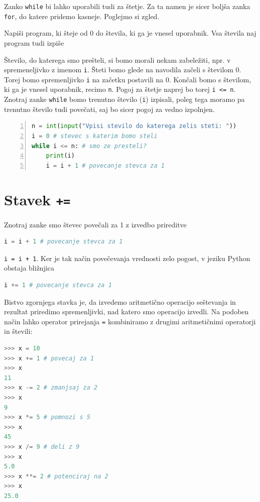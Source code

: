 Zanko \texttt{while} bi lahko uporabili tudi za štetje. Za ta namen je sicer boljša zanka \texttt{for}, do katere pridemo kasneje. Poglejmo si zgled.
\begin{zgled}
Napiši program, ki šteje od 0 do števila, ki ga je vnesel uporabnik. Vsa števila naj program tudi izpiše
\end{zgled}
\begin{resitev}
Število, do katerega smo prešteli, si bomo morali nekam zabeležiti, npr. v spremeneljivko z imenom \texttt{i}. Šteti bomo glede na navodila začeli s številom 0. Torej bomo spremenljivko \texttt{i} na začetku postavili na 0. Končali bomo s številom, ki ga je vnesel uporabnik, recimo \texttt{n}. Pogoj za štetje naprej bo torej \texttt{i <= n}. Znotraj zanke \texttt{while} bomo trenutno število (\texttt{i}) izpisali, poleg tega moramo pa trenutno število tudi povečati, saj bo sicer pogoj za vedno izpolnjen. 
\begin{lstlisting}[language=Python,numbers=left]
n = int(input("Vpisi stevilo do katerega zelis steti: "))
i = 0 # stevec s katerim bomo steli
while i <= n: # smo ze presteli?
    print(i)
    i = i + 1 # povecanje stevca za 1
\end{lstlisting}
\end{resitev}

\section{Stavek \texttt{+=}}
Znotraj zanke smo števec povečali za 1 z izvedbo prireditve
\begin{lstlisting}[language=Python]
i = i + 1 # povecanje stevca za 1
\end{lstlisting}
\texttt{i = i + 1}. Ker je tak način povečevanja vrednosti zelo pogost, v jeziku Python obstaja bližnjica
\begin{lstlisting}[language=Python]
i += 1 # povecanje stevca za 1
\end{lstlisting}
Bistvo zgornjega stavka je, da izvedemo aritmetično operacijo seštevanja in rezultat priredimo spremenljivki, nad katero smo operacijo izvedli. Na podoben način lahko operator prirejanja \texttt{=} kombiniramo z drugimi aritmetičnimi operatorji in števili:
\begin{lstlisting}[language=Python]
>>> x = 10
>>> x += 1 # povecaj za 1
>>> x
11
>>> x -= 2 # zmanjsaj za 2
>>> x
9
>>> x *= 5 # pomnozi s 5
>>> x
45
>>> x /= 9 # deli z 9
>>> x
5.0
>>> x **= 2 # potenciraj na 2
>>> x
25.0
\end{lstlisting}

